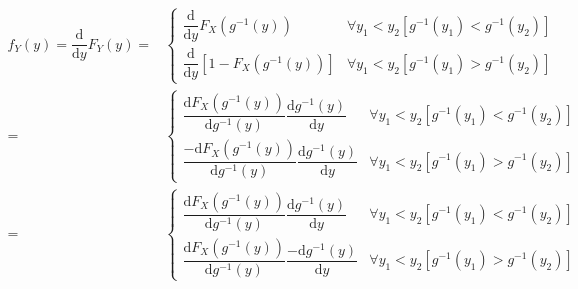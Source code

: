 \documentclass[
]{book}
\theoremstyle{definition}
\theoremstyle{definition}
\theoremstyle{definition}
\theoremstyle{definition}
\theoremstyle{remark}
\begin{document}
\[
\begin{aligned}
f_{{\scriptscriptstyle Y}}\left(y\right)=\dfrac{\mathrm{d}}{\mathrm{d}y}F_{{\scriptscriptstyle Y}}\left(y\right)= & \begin{cases}
\dfrac{\mathrm{d}}{\mathrm{d}y}F_{{\scriptscriptstyle X}}\left(g^{-1}\left(y\right)\right) & \forall y_{{\scriptscriptstyle 1}}<y_{{\scriptscriptstyle 2}}\left[g^{-1}\left(y_{{\scriptscriptstyle 1}}\right)<g^{-1}\left(y_{{\scriptscriptstyle 2}}\right)\right]\\
\dfrac{\mathrm{d}}{\mathrm{d}y}\left[1-F_{{\scriptscriptstyle X}}\left(g^{-1}\left(y\right)\right)\right] & \forall y_{{\scriptscriptstyle 1}}<y_{{\scriptscriptstyle 2}}\left[g^{-1}\left(y_{{\scriptscriptstyle 1}}\right)>g^{-1}\left(y_{{\scriptscriptstyle 2}}\right)\right]
\end{cases}\\
= & \begin{cases}
\dfrac{\mathrm{d}F_{{\scriptscriptstyle X}}\left(g^{-1}\left(y\right)\right)}{\mathrm{d}g^{-1}\left(y\right)}\dfrac{\mathrm{d}g^{-1}\left(y\right)}{\mathrm{d}y} & \forall y_{{\scriptscriptstyle 1}}<y_{{\scriptscriptstyle 2}}\left[g^{-1}\left(y_{{\scriptscriptstyle 1}}\right)<g^{-1}\left(y_{{\scriptscriptstyle 2}}\right)\right]\\
\dfrac{-\mathrm{d}F_{{\scriptscriptstyle X}}\left(g^{-1}\left(y\right)\right)}{\mathrm{d}g^{-1}\left(y\right)}\dfrac{\mathrm{d}g^{-1}\left(y\right)}{\mathrm{d}y} & \forall y_{{\scriptscriptstyle 1}}<y_{{\scriptscriptstyle 2}}\left[g^{-1}\left(y_{{\scriptscriptstyle 1}}\right)>g^{-1}\left(y_{{\scriptscriptstyle 2}}\right)\right]
\end{cases}\\
= & \begin{cases}
\dfrac{\mathrm{d}F_{{\scriptscriptstyle X}}\left(g^{-1}\left(y\right)\right)}{\mathrm{d}g^{-1}\left(y\right)}\dfrac{\mathrm{d}g^{-1}\left(y\right)}{\mathrm{d}y} & \forall y_{{\scriptscriptstyle 1}}<y_{{\scriptscriptstyle 2}}\left[g^{-1}\left(y_{{\scriptscriptstyle 1}}\right)<g^{-1}\left(y_{{\scriptscriptstyle 2}}\right)\right]\\
\dfrac{\mathrm{d}F_{{\scriptscriptstyle X}}\left(g^{-1}\left(y\right)\right)}{\mathrm{d}g^{-1}\left(y\right)}\dfrac{-\mathrm{d}g^{-1}\left(y\right)}{\mathrm{d}y} & \forall y_{{\scriptscriptstyle 1}}<y_{{\scriptscriptstyle 2}}\left[g^{-1}\left(y_{{\scriptscriptstyle 1}}\right)>g^{-1}\left(y_{{\scriptscriptstyle 2}}\right)\right]
\end{cases}\\

\end{aligned}\]
\end{document}
